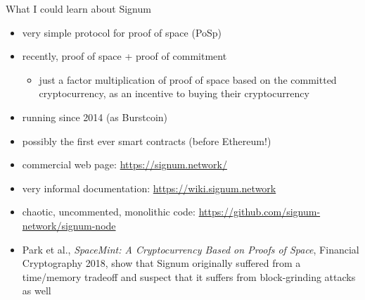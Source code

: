 \documentclass[11pt]{beamer}  %
\begin{document}
\begin{frame}{What I could learn about Signum}

  \begin{itemize}
  \item very simple protocol for proof of space (PoSp)
  \item recently, proof of space + proof of commitment
    \begin{itemize}
    \item[] just a factor multiplication of proof of space
      based on the committed cryptocurrency, as an incentive
      to buying their cryptocurrency
    \end{itemize}
  \item running since 2014 (as Burstcoin)
  \item possibly the first ever smart contracts (before Ethereum!)
  \item commercial web page: \url{https://signum.network/}
  \item very informal documentation:
    \url{https://wiki.signum.network}
  \item chaotic, uncommented, monolithic code:
    \url{https://github.com/signum-network/signum-node}
  \item Park et al., \emph{SpaceMint: A Cryptocurrency Based on Proofs of Space},
    Financial Cryptography 2018,
    show that Signum originally suffered from a time/memory tradeoff
    and suspect that it suffers from block-grinding attacks as well
  \end{itemize}

\end{frame}
\end{document}
